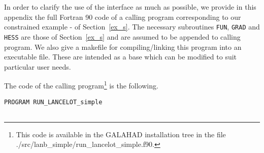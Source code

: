 \documentclass{article}
\begin{document}
In order to clarify the use of the interface as much as possible, we provide
in this appendix the full Fortran 90 code of a calling program corresponding to
our constrained example - of Section~\ref{ex_s}.   The
necessary subroutines  {\tt  FUN}, {\tt GRAD} and {\tt HESS} are those of
Section~\ref{ex_s} and are assumed to be appended to calling program.
We also give a makefile for compiling/linking this program into an executable
file. These are intended as a base which can be modified to suit particular
user needs.

The code of the calling program\footnote{This code is available
in the {\sf GALAHAD} installation tree in the file
./src/lanb\_simple/run\_lancelot\_simple.f90.} is the following.

\begin{lstlisting}
PROGRAM RUN_LANCELOT_simple


\end{lstlisting}
\end{document}
